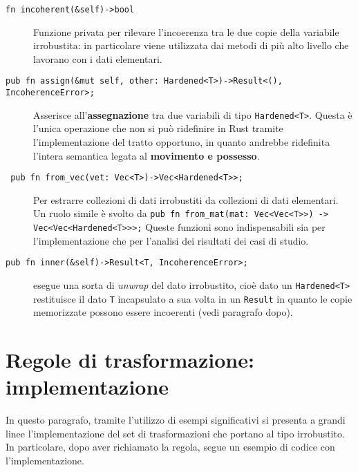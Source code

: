 \begin{description}
    \item[\texttt{fn incoherent(\&self)->bool}] Funzione privata per rilevare l'incoerenza tra le due copie della variabile irrobustita: in particolare viene utilizzata dai metodi di più alto livello che lavorano con i dati elementari.
    \item[\texttt{pub fn assign(\&mut self, other: Hardened<T>)->Result<(), IncoherenceError>;}]\quad \newline Asserisce all'\textbf{assegnazione} tra due variabili di tipo \texttt{Hardened<T>}. Questa è l'unica operazione che non si può ridefinire in Rust tramite l'implementazione del tratto opportuno, in quanto andrebbe ridefinita l'intera semantica legata al \textbf{movimento e possesso}.
    \item[\texttt{ pub fn from\_vec(vet: Vec<T>)->Vec<Hardened<T>>;} ] Per estrarre collezioni di dati irrobustiti da collezioni di dati elementari. Un ruolo simile è svolto da \newline \texttt{pub fn from\_mat(mat: Vec<Vec<T>>) -> Vec<Vec<Hardened<T>>>;} Queste funzioni sono indispensabili sia per l'implementazione che per l'analisi dei risultati dei casi di studio.
    \item[\texttt{pub fn inner(\&self)->Result<T, IncoherenceError>;}] esegue una sorta di \textit{unwrap} del dato irrobustito, cioè dato un \texttt{Hardened<T>} restituisce il dato \texttt{T} incapsulato a sua volta in un \texttt{Result} in quanto le copie memorizzate possono essere incoerenti (vedi paragrafo dopo).
\end{description}

\section{Regole di trasformazione: implementazione}\label{sec:transf_impl}
In questo paragrafo, tramite l'utilizzo di esempi significativi si presenta a grandi linee l'implementazione del set di trasformazioni che portano al tipo irrobustito. In particolare, dopo aver richiamato la regola, segue un esempio di codice con l'implementazione.\\

\noindent
\begin{center}
%
\end{center}

